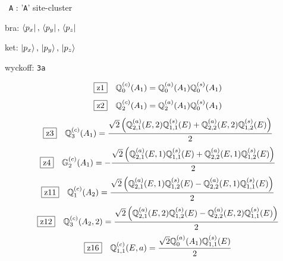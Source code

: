 \documentclass[fleqn,10pt,landscape]{jsarticle}
\begin{document}
\vspace{5mm}

\noindent\textbullet\, \texttt{A} : '\texttt{A}' site-cluster

\noindent\quad * bra: $\bra{p_{x}},\, \bra{p_{y}},\, \bra{p_{z}}$

\noindent\quad * ket: $\ket{p_{x}},\, \ket{p_{y}},\, \ket{p_{z}}$

\noindent\quad * wyckoff: \texttt{3a}

\begin{dmath*}
\hspace*{3mm}\fbox{z1}\quad \mathbb{Q}_{0}^{(c)}(A_{1})=\mathbb{Q}_{0}^{(a)}(A_{1}) \mathbb{Q}_{0}^{(s)}(A_{1})
\end{dmath*}
\begin{dmath*}
\hspace*{3mm}\fbox{z2}\quad \mathbb{Q}_{2}^{(c)}(A_{1})=\mathbb{Q}_{2}^{(a)}(A_{1}) \mathbb{Q}_{0}^{(s)}(A_{1})
\end{dmath*}
\begin{dmath*}
\hspace*{3mm}\fbox{z3}\quad \mathbb{Q}_{3}^{(c)}(A_{1})=\frac{\sqrt{2} \left(\mathbb{Q}_{2,1}^{(a)}(E,2) \mathbb{Q}_{1,1}^{(s)}(E) + \mathbb{Q}_{2,2}^{(a)}(E,2) \mathbb{Q}_{1,2}^{(s)}(E)\right)}{2}
\end{dmath*}
\begin{dmath*}
\hspace*{3mm}\fbox{z4}\quad \mathbb{G}_{2}^{(c)}(A_{1})=- \frac{\sqrt{2} \left(\mathbb{Q}_{2,1}^{(a)}(E,1) \mathbb{Q}_{1,1}^{(s)}(E) + \mathbb{Q}_{2,2}^{(a)}(E,1) \mathbb{Q}_{1,2}^{(s)}(E)\right)}{2}
\end{dmath*}
\begin{dmath*}
\hspace*{3mm}\fbox{z11}\quad \mathbb{Q}_{1}^{(c)}(A_{2})=\frac{\sqrt{2} \left(\mathbb{Q}_{2,1}^{(a)}(E,1) \mathbb{Q}_{1,2}^{(s)}(E) - \mathbb{Q}_{2,2}^{(a)}(E,1) \mathbb{Q}_{1,1}^{(s)}(E)\right)}{2}
\end{dmath*}
\begin{dmath*}
\hspace*{3mm}\fbox{z12}\quad \mathbb{Q}_{3}^{(c)}(A_{2},2)=\frac{\sqrt{2} \left(\mathbb{Q}_{2,1}^{(a)}(E,2) \mathbb{Q}_{1,2}^{(s)}(E) - \mathbb{Q}_{2,2}^{(a)}(E,2) \mathbb{Q}_{1,1}^{(s)}(E)\right)}{2}
\end{dmath*}
\begin{dmath*}
\hspace*{3mm}\fbox{z16}\quad \mathbb{Q}_{1,1}^{(c)}(E,a)=\frac{\sqrt{2} \mathbb{Q}_{0}^{(a)}(A_{1}) \mathbb{Q}_{1,1}^{(s)}(E)}{2}
\end{dmath*}
\end{document}
